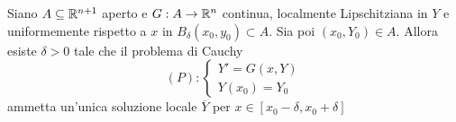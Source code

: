 \begin{theorem} \label{Teo: Esistenza e unicità locale}
    Siano $A \subseteq \mathbb{R}^{n+1}$ aperto e $G:A \to \mathbb{R}^n$ continua, localmente Lipschitziana in $Y$ e uniformemente rispetto a $x$ in $B_\delta(x_0, y_0) \subset A$. Sia poi $(x_0, Y_0) \in A$. Allora esiste $\delta>0$ tale che il problema di Cauchy
    \begin{equation*}
        (P): \begin{cases}
            Y'=G(x, Y)\\
            Y(x_0)=Y_0
        \end{cases}
    \end{equation*}
    ammetta un'unica soluzione locale $\overline{Y}$ per $x \in [x_0-\delta, x_0+\delta]$
\end{theorem}
